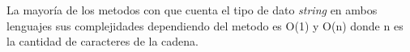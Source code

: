 La mayoría de los metodos con que cuenta el tipo de dato \emph{string} en ambos lenguajes sus complejidades dependiendo del metodo es O(1) y O(n) donde n es la cantidad de caracteres de la cadena.